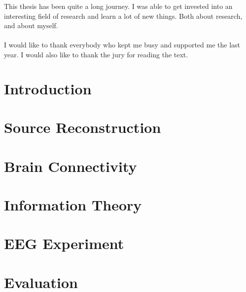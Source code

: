 \documentclass[master=mai, masteroption=ecs]{kulemt}
\begin{document}
\renewcommand{\prefacename}{Acknowledgements}
\begin{preface}
  This thesis has been quite a long journey. I was able to get invested into an interesting field of research and learn a lot of new things. Both about research, and about myself. \\ 
\\
  I would like to thank everybody who kept me busy and supported me the last year. I would also like to thank the jury for reading the text. 
\end{preface}

\tableofcontents*

\begin{abstract}

\end{abstract}

\setlength{\parindent}{0pt}
\setlength{\parskip}{1em}

\listoffigures

\mainmatter

\chapter{Introduction}


\chapter{Source Reconstruction}


\chapter{Brain Connectivity}


\chapter{Information Theory}


\chapter{EEG Experiment}


\chapter{Evaluation}

\end{document}
